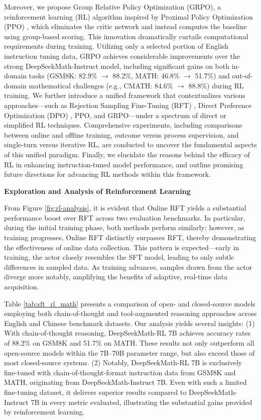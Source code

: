 Moreover, we propose Group Relative Policy Optimization (GRPO), a reinforcement learning (RL) algorithm inspired by Proximal Policy Optimization (PPO) \citep{schulman2017proximal}, which eliminates the critic network and instead computes the baseline using group-based scoring. This innovation dramatically curtails computational requirements during training. Utilizing only a selected portion of English instruction tuning data, GRPO achieves considerable improvements over the strong DeepSeekMath-Instruct model, including significant gains on both in-domain tasks (GSM8K: 82.9\% $\rightarrow$ 88.2\%, MATH: 46.8\% $\rightarrow$ 51.7\%) and out-of-domain mathematical challenges (e.g., CMATH: 84.6\% $\rightarrow$ 88.8\%) during RL training. We further introduce a unified framework that contextualizes various approaches—such as Rejection Sampling Fine-Tuning (RFT) \citep{yuan2023scaling}, Direct Preference Optimization (DPO) \citep{dpo}, PPO, and GRPO—under a spectrum of direct or simplified RL techniques. Comprehensive experiments, including comparisons between online and offline training, outcome versus process supervision, and single-turn versus iterative RL, are conducted to uncover the fundamental aspects of this unified paradigm. Finally, we elucidate the reasons behind the efficacy of RL in enhancing instruction-tuned model performance, and outline promising future directions for advancing RL methods within this framework.

\textbf{Exploration and Analysis of Reinforcement Learning}

From Figure \ref{fig:rl-analysis}, it is evident that Online RFT yields a substantial performance boost over RFT across two evaluation benchmarks. In particular, during the initial training phase, both methods perform similarly; however, as training progresses, Online RFT distinctly surpasses RFT, thereby demonstrating the effectiveness of online data collection. This pattern is expected—early in training, the actor closely resembles the SFT model, leading to only subtle differences in sampled data. As training advances, samples drawn from the actor diverge more notably, amplifying the benefits of adaptive, real-time data acquisition.

Table \ref{tab:sft_rl_math} presents a comparison of open- and closed-source models employing both chain-of-thought and tool-augmented reasoning approaches across English and Chinese benchmark datasets. Our analysis yields several insights: (1) With chain-of-thought reasoning, DeepSeekMath-RL 7B achieves accuracy rates of 88.2\% on GSM8K and 51.7\% on MATH. These results not only outperform all open-source models within the 7B–70B parameter range, but also exceed those of most closed-source systems. (2) Notably, DeepSeekMath-RL 7B is exclusively fine-tuned with chain-of-thought-format instruction data from GSM8K and MATH, originating from DeepSeekMath-Instruct 7B. Even with such a limited fine-tuning dataset, it delivers superior results compared to DeepSeekMath-Instruct 7B in every metric evaluated, illustrating the substantial gains provided by reinforcement learning.

